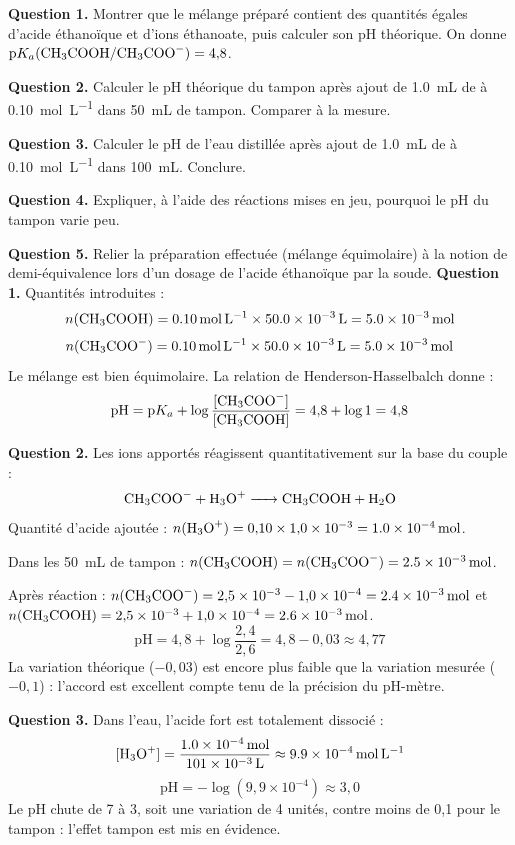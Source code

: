 \documentclass[11pt]{article}
\begin{document}
\begin{exoresolu}
\textbf{Question 1.} Montrer que le mélange préparé contient des quantités égales d'acide éthanoïque et d'ions éthanoate, puis calculer son pH théorique. On donne $\mathrm{p}K_a(\ce{CH3COOH}/\ce{CH3COO-}) = 4{,}8$.

\textbf{Question 2.} Calculer le pH théorique du tampon après ajout de \SI{1,0}{mL} de  à \SI{0,10}{mol.L^{-1}} dans \SI{50}{mL} de tampon. Comparer à la mesure.

\textbf{Question 3.} Calculer le pH de l'eau distillée après ajout de \SI{1,0}{mL} de  à \SI{0,10}{mol.L^{-1}} dans \SI{100}{mL}. Conclure.

\textbf{Question 4.} Expliquer, à l'aide des réactions mises en jeu, pourquoi le pH du tampon varie peu.

\textbf{Question 5.} Relier la préparation effectuée (mélange équimolaire) à la notion de demi-équivalence lors d'un dosage de l'acide éthanoïque par la soude.
\tcblower
\textbf{Question 1.} Quantités introduites :
\[ n(\ce{CH3COOH}) = \SI{0,10}{mol.L^{-1}} \times \SI{50,0e-3}{L} = \SI{5,0e-3}{mol} \]
\[ n(\ce{CH3COO-}) = \SI{0,10}{mol.L^{-1}} \times \SI{50,0e-3}{L} = \SI{5,0e-3}{mol} \]
Le mélange est bien équimolaire. La relation de Henderson-Hasselbalch donne :
\[ \mathrm{pH} = \mathrm{p}K_a + \log\frac{[\ce{CH3COO-}]}{[\ce{CH3COOH}]} = 4{,}8 + \log 1 = 4{,}8 \]

\textbf{Question 2.} Les ions  apportés réagissent quantitativement sur la base du couple :
\[ \ce{CH3COO- + H3O+ -> CH3COOH + H2O} \]
Quantité d'acide ajoutée : $n(\ce{H3O+}) = 0{,}10 \times 1{,}0\times10^{-3} = \SI{1,0e-4}{mol}$.

Dans les \SI{50}{mL} de tampon : $n(\ce{CH3COOH}) = n(\ce{CH3COO-}) = \SI{2,5e-3}{mol}$.

Après réaction : $n(\ce{CH3COO-}) = 2{,}5\times10^{-3} - 1{,}0\times10^{-4} = \SI{2,4e-3}{mol}$ et $n(\ce{CH3COOH}) = 2{,}5\times10^{-3} + 1{,}0\times10^{-4} = \SI{2,6e-3}{mol}$.
\[ \mathrm{pH} = 4{,}8 + \log\frac{2{,}4}{2{,}6} = 4{,}8 - 0{,}03 \approx 4{,}77 \]
La variation théorique ($-0{,}03$) est encore plus faible que la variation mesurée ($-0{,}1$) : l'accord est excellent compte tenu de la précision du pH-mètre.

\textbf{Question 3.} Dans l'eau, l'acide fort est totalement dissocié :
\[ [\ce{H3O+}] = \frac{\SI{1,0e-4}{mol}}{\SI{101e-3}{L}} \approx \SI{9,9e-4}{mol.L^{-1}} \]
\[ \mathrm{pH} = -\log(9{,}9\times10^{-4}) \approx 3{,}0 \]
Le pH chute de 7 à 3, soit une variation de 4 unités, contre moins de 0{,}1 pour le tampon : l'effet tampon est mis en évidence.


\end{exoresolu}
\end{document}
